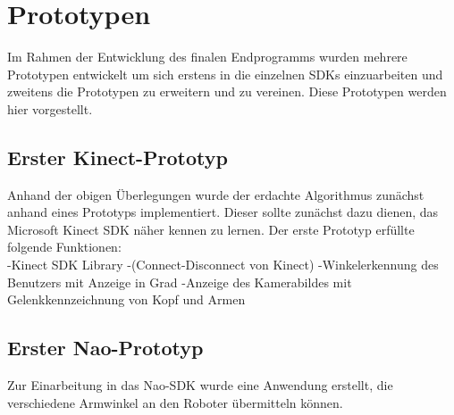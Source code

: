 \section{Prototypen}
Im Rahmen der Entwicklung des finalen Endprogramms wurden mehrere Prototypen entwickelt um sich erstens in die einzelnen SDKs einzuarbeiten und zweitens die Prototypen zu erweitern und zu vereinen. Diese Prototypen werden hier vorgestellt.

\subsection{Erster Kinect-Prototyp}
Anhand der obigen Überlegungen wurde der erdachte Algorithmus zunächst anhand eines Prototyps implementiert. Dieser sollte zunächst dazu dienen, das Microsoft Kinect SDK näher kennen zu lernen. Der erste Prototyp erfüllte folgende Funktionen:\\
-Kinect SDK Library
-(Connect-Disconnect von Kinect)
-Winkelerkennung des Benutzers mit Anzeige in Grad
-Anzeige des Kamerabildes mit Gelenkkennzeichnung von Kopf und Armen

\subsection{Erster Nao-Prototyp}
Zur Einarbeitung in das Nao-SDK wurde eine Anwendung erstellt, die verschiedene Armwinkel an den Roboter übermitteln können.

